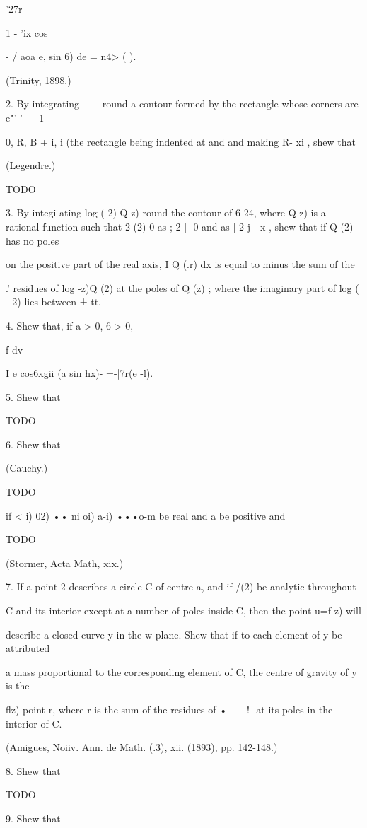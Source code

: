 '27r

1 - 'ix cos

  - / aoa e, sin 6) de = n4> ( ).

(Trinity, 1898.)

2. By integrating - — round a contour formed by the rectangle whose
corners are e"' ' — 1

0, R, B + i, i (the rectangle being indented at and and making R- xi ,
shew that

(Legendre.)

TODO

3. By integi-ating log (-2) Q z) round the contour of 6-24, where Q z)
is a rational function such that 2 (2) 0 as ; 2 |- 0 and as ] 2 j - x
, shew that if Q (2) has no poles

on the positive part of the real axis, I Q (.r) dx is equal to minus
the sum of the

.' residues of log -z)Q (2) at the poles of Q (z) ; where the
imaginary part of log ( - 2) lies between ± tt.

4. Shew that, if a > 0, 6 > 0,

f dv

I e cos6xgii (a sin hx)- =-|7r(e -l).

5. Shew that

TODO

6. Shew that

(Cauchy.)

TODO

if < i) 02) •• ni oi) a-i) •••o-m be real and a be positive and

TODO

(Stormer, Acta Math, xix.)

7. If a point 2 describes a circle C of centre a, and if /(2) be
analytic throughout

C and its interior except at a number of poles inside C, then the
point u=f z) will

describe a closed curve y in the w-plane. Shew that if to each element
of y be attributed

a mass proportional to the corresponding element of C, the centre of
gravity of y is the

flz) point r, where r is the sum of the residues of • — -!- at its
poles in the interior of C.

(Amigues, Noiiv. Ann. de Math. (.3), xii. (1893), pp. 142-148.)

8. Shew that

TODO

9. Shew that

